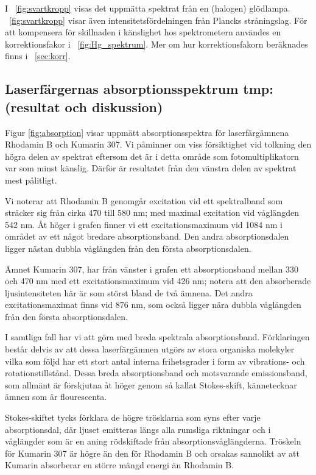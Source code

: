 \documentclass[11pt,a4paper]{article}
\newcommand{\figref}{\figurename~\ref}
\begin{document}
I \figref{fig:svartkropp} visas det uppmätta spektrat från en
(halogen) glödlampa. \figref{fig:svartkropp} visar även
intensitetsfördelningen från Plancks stråningslag. För att kompensera
för skillnaden i känslighet hos spektrometern användes en
korrektionsfakor i \figref{fig:Hg_spektrum}. Mer om hur
korrektionsfakorn beräknades finns i \appendixname~\ref{sec:korr}.


\subsection{Laserfärgernas absorptionsspektrum tmp:(resultat och diskussion)}

Figur \ref{fig:absorption} visar uppmätt absorptionsspektra för laserfärgämnena Rhodamin B och Kumarin 307. Vi påminner om viss försiktighet vid tolkning den högra delen av spektrat eftersom det är i detta område som fotomultiplikatorn var som minst känslig. Därför är resultatet från den vänstra delen av spektrat mest pålitligt. 

Vi noterar att Rhodamin B genomgår excitation vid ett spektralband som sträcker sig från cirka 470 till 580 nm; med maximal excitation vid våglängden 542 nm. Åt höger i grafen finner vi ett excitationsmaximum vid 1084 nm i området av ett något bredare absorptionsband. Den andra absorptionsdalen ligger nästan dubbla våglängden från den första absorptionsdalen.

Ämnet Kumarin 307, har från vänster i grafen ett absorptionsband mellan 330 och 470 nm med ett excitationsmaximum vid 426 nm; notera att den absorberade ljusintensiteten här är som störst bland de två ämnena. Det andra excitationsmaximat finns vid 876 nm, som också ligger nära dubbla våglängden från den första absorptionsdalen.

I samtliga fall har vi att göra med breda spektrala absorptionsband. Förklaringen består delvis av att dessa laserfärgämnen utgörs av stora organiska molekyler vilka som följd har ett stort antal interna frihetsgrader i form av vibrations- och rotationstillstånd. Dessa breda absorptionsband och motsvarande emissionsband, som allmänt är förskjutna åt höger genom så kallat Stokes-skift, kännetecknar ämnen som är flourescenta. 

Stokes-skiftet tycks förklara de högre trösklarna som syns efter varje absorptionsdal, där ljuset emitteras längs alla rumsliga riktningar och i våglängder som är en aning rödskiftade från absorptionsvåglängderna. Tröskeln för Kumarin 307 är högre än den för Rhodamin B och orsakas sannolikt av att Kumarin absorberar en större mängd energi än Rhodamin B.
\end{document}
